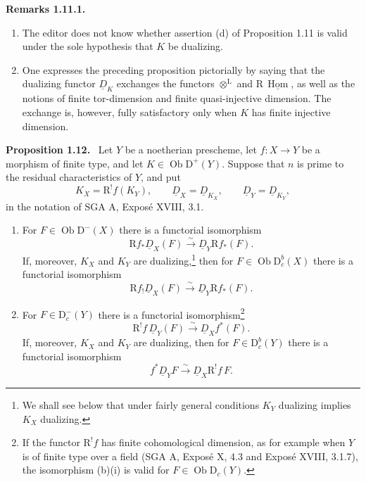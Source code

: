 \documentclass[12pt]{article}
\newcommand{\Hom}{\operatorname{Hom}}
\newcommand{\ob}{\operatorname{Ob}}
\newcommand{\D}{\mathrm D}
\newcommand{\R}{\mathrm R}
\newenvironment{statement}[1]{\par\medskip\noindent\textbf{#1.}\ }{\par\medskip}
\begin{document}
\begin{statement}{Remarks 1.11.1}
\begin{enumerate}[label=\alph*)]
\item The editor does not know whether assertion (d) of Proposition 1.11 is valid under the sole hypothesis that $K$ be dualizing.
\item One expresses the preceding proposition pictorially by saying that the dualizing functor $\underline D_K$ exchanges the functors $\otimes^{\mathrm L}$ and $\R\,\underline{\Hom}$, as well as the notions of finite tor-dimension and finite quasi-injective dimension. The exchange is, however, fully satisfactory only when $K$ has finite injective dimension.
\end{enumerate}
\end{statement}

\begin{statement}{Proposition 1.12}
Let $Y$ be a noetherian prescheme, let $f:X\to Y$ be a morphism of finite type, and let $K\in\ob\D^+(Y)$. Suppose that $n$ is prime to the residual characteristics of $Y$, and put
\[
   K_X=\R^!f(K_Y),\qquad \underline D_X=\underline D_{K_X},\qquad \underline D_Y=\underline D_{K_Y},
\]
in the notation of SGA A, Exposé XVIII, 3.1.
\begin{enumerate}[label=\alph*)]
\item For $F\in\ob\D^-(X)$ there is a functorial isomorphism
\[
   \R f_*\underline D_X(F)\xrightarrow{\sim}\underline D_Y\R f_*(F).\tag{i}
\]
If, moreover, $K_X$ and $K_Y$ are dualizing,\footnote{We shall see below that under fairly general conditions $K_Y$ dualizing implies $K_X$ dualizing.} then for $F\in\ob\D_c^b(X)$ there is a functorial isomorphism
\[
   \R f_!\underline D_X(F)\xrightarrow{\sim}\underline D_Y\R f_*(F).\tag{ii}
\]

\item For $F\in\D_c^-(Y)$ there is a functorial isomorphism\footnote{If the functor $\R^!f$ has finite cohomological dimension, as for example when $Y$ is of finite type over a field (SGA A, Exposé X, 4.3 and Exposé XVIII, 3.1.7), the isomorphism (b)(i) is valid for $F\in\ob\D_c(Y)$.}
\[
   \R^!f\,\underline D_Y(F)\xrightarrow{\sim}\underline D_X f^*(F).\tag{i}
\]
If, moreover, $K_X$ and $K_Y$ are dualizing, then for $F\in\D_c^b(Y)$ there is a functorial isomorphism
\[
   f^*\underline D_YF\xrightarrow{\sim}\underline D_X\R^!f\,F.\tag{ii}
\]
\end{enumerate}
\end{statement}
\end{document}
